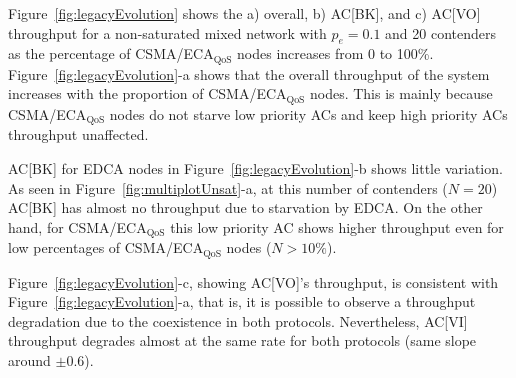 Figure~\ref{fig:legacyEvolution} shows the a) overall, b) AC[BK], and c) AC[VO] throughput for a non-saturated mixed network with $p_e=0.1$ and 20 contenders as the percentage of CSMA/ECA$_{\text{QoS}}$ nodes increases from 0 to 100\%. Figure~\ref{fig:legacyEvolution}-a shows that the overall throughput of the system increases with the proportion of CSMA/ECA$_{\text{QoS}}$ nodes. This is mainly because CSMA/ECA$_{\text{QoS}}$ nodes do not starve low priority ACs and keep high priority ACs throughput unaffected.

AC[BK] for EDCA nodes in Figure~\ref{fig:legacyEvolution}-b shows little variation. As seen in Figure~\ref{fig:multiplotUnsat}-a, at this number of contenders ($N=20$) AC[BK] has almost no throughput due to starvation by EDCA. On the other hand, for CSMA/ECA$_{\text{QoS}}$ this low priority AC shows higher throughput even for low percentages of CSMA/ECA$_{\text{QoS}}$ nodes ($N>10\%$).

Figure~\ref{fig:legacyEvolution}-c, showing AC[VO]'s throughput, is consistent with Figure~\ref{fig:legacyEvolution}-a, that is, it is possible to observe a throughput degradation due to the coexistence in both protocols. Nevertheless, AC[VI] throughput degrades almost at the same rate for both protocols (same slope around $\pm 0.6$).

